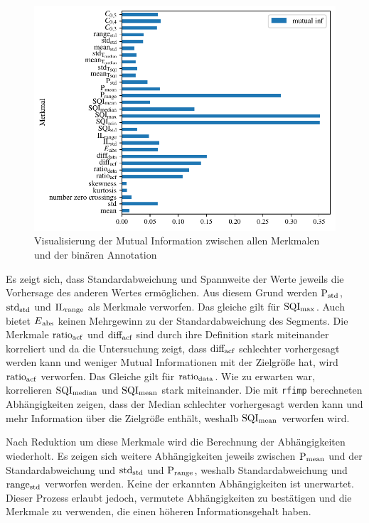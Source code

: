 \begin{figure}[H] %
	\centering
	\includegraphics{pic/mutual-inf-own.pdf}
	\caption{Visualisierung der Mutual Information zwischen allen Merkmalen und der binären Annotation}
	\label{fig:mutual-inf-own-all}
\end{figure}

Es zeigt sich, dass Standardabweichung und Spannweite der Werte jeweils die Vorhersage des anderen Wertes ermöglichen. Aus diesem Grund werden $\text{P}\textsubscript{std}$, $\text{std}\textsubscript{std}$ und $\text{IL}\textsubscript{range}$ als Merkmale verworfen. Das gleiche gilt für $\text{SQI}\textsubscript{max}$. Auch bietet $E\textsubscript{abs}$ keinen Mehrgewinn zu der Standardabweichung des Segments. Die Merkmale $\text{ratio}\textsubscript{acf}$ und $\text{diff}\textsubscript{acf}$ sind durch ihre Definition stark miteinander korreliert und da die Untersuchung zeigt, dass $\text{diff}\textsubscript{acf}$ schlechter vorhergesagt werden kann und weniger Mutual Informationen mit der Zielgröße hat, wird $\text{ratio}\textsubscript{acf}$ verworfen. Das Gleiche gilt für $\text{ratio}\textsubscript{data}$. Wie zu erwarten war, korrelieren $\text{SQI}\textsubscript{median}$ und $\text{SQI}\textsubscript{mean}$ stark miteinander. Die mit \texttt{rfimp} berechneten Abhängigkeiten zeigen, dass der Median schlechter vorhergesagt werden kann und mehr Information über die Zielgröße enthält, weshalb $\text{SQI}\textsubscript{mean}$ verworfen wird.

Nach Reduktion um diese Merkmale wird die Berechnung der Abhängigkeiten wiederholt. Es zeigen sich weitere Abhängigkeiten jeweils zwischen $\text{P}\textsubscript{mean}$ und der Standardabweichung und $\text{std}\textsubscript{std}$ und $\text{P}\textsubscript{range}$, weshalb Standardabweichung und $\text{range}\textsubscript{std}$ verworfen werden. Keine der erkannten Abhängigkeiten ist unerwartet. Dieser Prozess erlaubt jedoch, vermutete Abhängigkeiten zu bestätigen und die Merkmale zu verwenden, die einen höheren Informationsgehalt haben.

